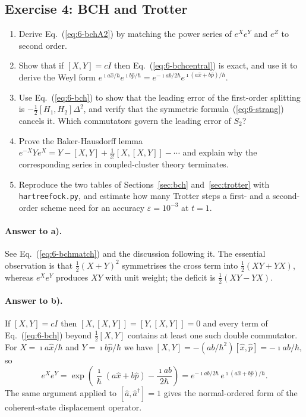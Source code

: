 \subsection*{Exercise 4: BCH and Trotter}
\label{ex:6-bch}

\begin{enumerate}
  \item[a)] Derive Eq.~(\ref{eq:6-bchA2}) by matching the power series of
  $e^{X}e^{Y}$ and $e^{Z}$ to second order.
  \item[b)] Show that if $[X,Y]=cI$ then Eq.~(\ref{eq:6-bchcentral}) is
  exact, and use it to derive the Weyl form
  $e^{\imath a\hat{x}/\hbar}e^{\imath b\hat{p}/\hbar}
  = e^{-\imath ab/2\hbar}e^{\imath(a\hat{x}+b\hat{p})/\hbar}$.
  \item[c)] Use Eq.~(\ref{eq:6-bch}) to show that the leading error of the
  first-order splitting is $-\tfrac{1}{2}[H_1,H_2]\Delta^2$, and verify that
  the symmetric formula~(\ref{eq:6-strang}) cancels it.  Which commutators
  govern the leading error of $S_2$?
  \item[d)] Prove the Baker-Hausdorff lemma
  $e^{-X}Ye^{X}=Y-[X,Y]+\tfrac1{2!}[X,[X,Y]]-\cdots$ and explain why the
  corresponding series in coupled-cluster theory terminates.
  \item[e)] Reproduce the two tables of Sections~\ref{sec:bch}
  and~\ref{sec:trotter} with \texttt{hartreefock.py}, and estimate how many
  Trotter steps a first- and a second-order scheme need for an accuracy
  $\varepsilon=10^{-3}$ at $t=1$.
\end{enumerate}

\paragraph{Answer to a).}
See Eq.~(\ref{eq:6-bchmatch}) and the discussion following it.  The essential
observation is that $\tfrac12(X+Y)^2$ symmetrises the cross term into
$\tfrac12(XY+YX)$, whereas $e^{X}e^{Y}$ produces $XY$ with unit weight; the
deficit is $\tfrac12(XY-YX)$.

\paragraph{Answer to b).}
If $[X,Y]=cI$ then $[X,[X,Y]]=[Y,[X,Y]]=0$ and every term of
Eq.~(\ref{eq:6-bch}) beyond $\tfrac12[X,Y]$ contains at least one such double
commutator.  For $X=\imath a\hat{x}/\hbar$ and $Y=\imath b\hat{p}/\hbar$ we
have $[X,Y]=-(ab/\hbar^2)[\hat{x},\hat{p}]=-\imath ab/\hbar$, so
\begin{equation}
  e^{X}e^{Y} = \exp\left(\frac{\imath}{\hbar}(a\hat{x}+b\hat{p})
    - \frac{\imath ab}{2\hbar}\right)
  = e^{-\imath ab/2\hbar}\,
    e^{\imath(a\hat{x}+b\hat{p})/\hbar}.
  \label{eq:6-exb5}
\end{equation}
The same argument applied to $[\hat{a},\hat{a}^{\dagger}]=1$ gives the
normal-ordered form of the coherent-state displacement operator.

